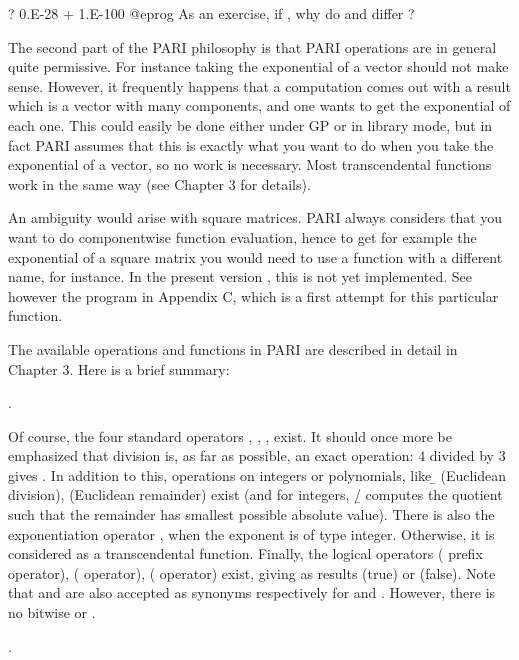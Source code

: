 \bprog
? 0.E-28 + 1.E-100
@eprog
\noindent As an exercise, if , why do  and
 differ ?

The second part of the PARI philosophy is that PARI operations are in general
quite permissive. For instance taking the exponential of a vector should not
make sense. However, it frequently happens that a computation comes out with a
result which is a vector with many components, and one wants to get the
exponential of each one. This could easily be done either under GP or in
library mode, but in fact PARI assumes that this is exactly what you want to
do when you take the exponential of a vector, so no work is necessary. Most
transcendental functions work in the same way (see Chapter 3 for details).

An ambiguity would arise with square matrices. PARI always considers that you
want to do componentwise function evaluation, hence to get for example the
exponential of a square matrix you would need to use a function with a
different name,  for instance. In the present version \vers, this
is not yet implemented. See however the program in Appendix C, which is a
first attempt for this particular function.

The available operations and functions in PARI are described in detail in
Chapter 3. Here is a brief summary:

.

\noindent
Of course, the four standard operators \kbd{+}, \kbd{-}, \kbd{*}, \kbd{/}
exist. It should once more be emphasized that division is, as far as possible,
an exact operation: $4$ divided by $3$ gives . In addition to
this, operations on integers or polynomials, like \b{} (Euclidean
division), \kbd{\%} (Euclidean remainder) exist (and for integers, {\b{/}}
computes the quotient such that the remainder has smallest possible absolute
value). There is also the exponentiation operator \kbd{\pow }, when the
exponent is of type integer. Otherwise, it is considered as a transcendental
function. Finally, the logical operators \kbd{!} ( prefix operator),
\kbd{\&\&} ( operator), \kbd{||} ( operator) exist, giving
as results  (true) or  (false). Note that \kbd{\&} and \kbd{|}
are also accepted as synonyms respectively for \kbd{\&\&} and \kbd{||}.
However, there is no bitwise  or .

.

